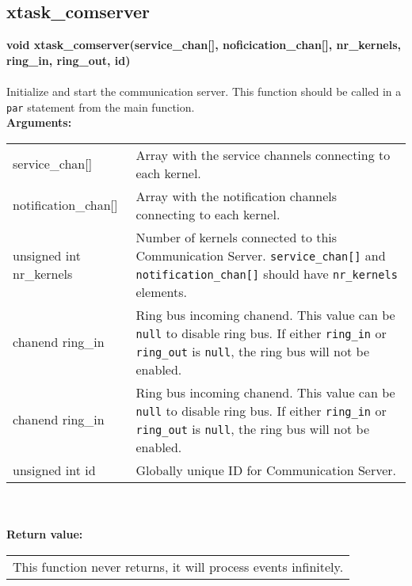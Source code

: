 \subsection{xtask\_comserver}
\noindent
\textbf{void xtask\_comserver(service\_chan[], noficication\_chan[], nr\_kernels, 
        ring\_in, ring\_out, id)}\\\\
Initialize and start the communication server.
This function should be called in a \verb|par| statement from the main function.\\

\noindent
\textbf{Arguments:}\\
\indent\begin{tabular}{ p{4.5cm}  p{9cm} }
service\_chan[]      & Array with the service channels connecting 
                       to each kernel.\\
notification\_chan[] & Array with the notification channels connecting
                       to each kernel.\\
unsigned int
nr\_kernels          & Number of kernels connected to this Communication Server.
                       \verb|service_chan[]| and \verb|notification_chan[]|
                       should have \verb|nr_kernels| elements.\\
chanend
ring\_in             & Ring bus incoming chanend. This value can be \verb|null|
                       to disable ring bus. If either \verb|ring_in| 
                       or \verb|ring_out| is \verb|null|,
                       the ring bus will not be enabled.\\
chanend
ring\_in             & Ring bus incoming chanend. This value can be \verb|null|
                       to disable ring bus. If either \verb|ring_in| 
                       or \verb|ring_out| is \verb|null|,
                       the ring bus will not be enabled.\\
unsigned int id      & Globally unique ID for Communication Server.
\end{tabular}\\\\

\noindent
\textbf{Return value:}\\
\indent\begin{tabular}{  p{13.5cm} }
This function never returns, it will process events infinitely.
\end{tabular}

